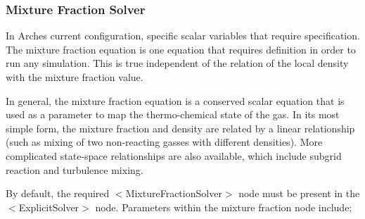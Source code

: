 \subsubsection{Mixture Fraction Solver}
In Arches current configuration, specific scalar variables that require specification.  The mixture fraction equation is one equation that requires definition in order to run any simulation.  This is true independent of the relation of the local density with the mixture fraction value.  

In general, the mixture fraction equation is a conserved scalar equation that is used as a parameter to map the thermo-chemical state of the gas.   In its most simple form, the mixture fraction and density are related by a linear relationship (such as mixing of two non-reacting gasses with different densities).  More complicated state-space relationships are also available, which include subgrid reaction and turbulence mixing.   

By default, the required $<$MixtureFractionSolver$>$ node must be present in the $<$ExplicitSolver$>$ node.  Parameters within the mixture fraction node include; 

